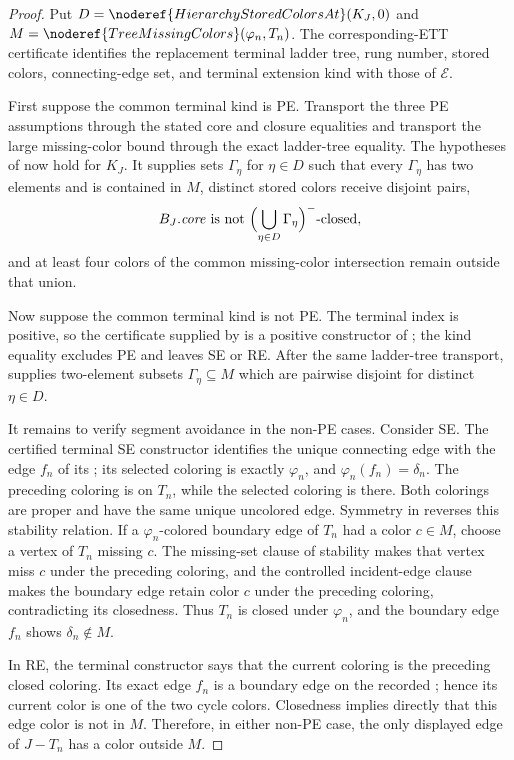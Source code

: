 \begin{proof}
Put $D=\noderef{HierarchyStoredColorsAt}(K_J,0)$ and
$M=\noderef{TreeMissingColors}(\varphi_n,T_n)$.  The corresponding-ETT
certificate identifies the replacement terminal ladder tree, rung number,
stored colors, connecting-edge set, and terminal extension kind with those
of $\mathcal E$.

First suppose the common terminal kind is PE.  Transport the three PE
assumptions through the stated core and closure equalities and transport
the large missing-color bound through the exact ladder-tree equality.
The hypotheses of  now hold for
$K_J$.  It supplies sets $\Gamma_\eta$ for $\eta\in D$ such that every
$\Gamma_\eta$ has two elements and is contained in $M$, distinct stored
colors receive disjoint pairs,
\[
 B_J.\mathit{core}\text{ is not }
   \Bigl(\bigcup_{\eta\in D}\Gamma_\eta\Bigr)^-\text{-closed},
\]
and at least four colors of the common missing-color intersection remain
outside that union.

Now suppose the common terminal kind is not PE.  The terminal index is
positive, so the certificate supplied by  is a
positive constructor of ; the kind equality
excludes PE and leaves SE or RE.  After the same ladder-tree transport,
 supplies two-element subsets
$\Gamma_\eta\subseteq M$ which are pairwise disjoint for distinct
$\eta\in D$.

It remains to verify segment avoidance in the non-PE cases.  Consider SE.
The certified terminal SE constructor identifies the unique connecting
edge with the edge $f_n$ of its
; its selected coloring is exactly
$\varphi_n$, and $\varphi_n(f_n)=\delta_n$.  The preceding coloring is
 on $T_n$, while the selected coloring is
 there.  Both colorings are proper and have the same unique
uncolored edge.  Symmetry in  reverses this stability
relation.  If a $\varphi_n$-colored boundary edge of $T_n$ had a color
$c\in M$, choose a vertex of $T_n$ missing $c$.  The missing-set clause
of stability makes that vertex miss $c$ under the preceding coloring,
and the controlled incident-edge clause makes the boundary edge retain
color $c$ under the preceding coloring, contradicting its closedness.
Thus $T_n$ is closed under $\varphi_n$, and the boundary edge $f_n$ shows
$\delta_n\notin M$.

In RE, the terminal constructor says that the current coloring is the
preceding closed coloring.  Its exact edge $f_n$ is a boundary edge on
the recorded ; hence its current color is one of
the two cycle colors.  Closedness implies directly that this edge color
is not in $M$.  Therefore, in either non-PE case, the only displayed edge
of $J-T_n$ has a color outside $M$.


\end{proof}
